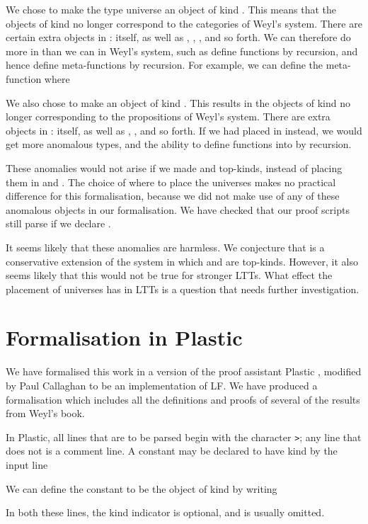 \documentclass[acmtocl]{acmtrans2m}
\begin{document}
We chose to make the type universe  an object of kind .  This means that the objects of kind  no longer correspond to the categories of Weyl's system.  There are certain extra objects in :  itself, as well as , , , and so forth.  We can therefore do more in  than we can in Weyl's system, such as
define functions  by recursion, and hence define meta-functions  by recursion.  For example, we can define the meta-function  where


We also chose to make  an object of kind .  This results in the objects of kind  no longer corresponding to the propositions of Weyl's system.  There are extra objects in :  itself, as well as , , and so forth.  If we had placed  in  instead, we would get more anomalous types, and the ability to define functions into  by recursion.

These anomalies would not arise if we made  and  top-kinds, instead of placing them in  and .
The choice of where to place the universes makes no practical difference for this formalisation, because we did not make use of any of these anomalous objects in our formalisation.  We have checked that our proof scripts still parse if we declare .

It seems likely that these anomalies are harmless.  We conjecture that  is a conservative extension of the system in which  and  are top-kinds.  However, it also seems likely that this would not be true for stronger LTTs.  What effect the placement of universes has in LTTs is a question that needs further investigation.

\section{Formalisation in Plastic}
\label{section:formal}

We have formalised this work in a version of the proof assistant
Plastic \cite{plastic}, modified by Paul Callaghan to be an
implementation of LF.  We have produced a formalisation which
includes all the definitions and proofs of several of the results
from Weyl's book.

In Plastic, all lines that are to be parsed begin with the character
\texttt{>}; any line that does not is a comment line.  A constant
 may be declared to have kind 
by the input line

We can define the constant  to be the object  of kind  by writing

In both these lines, the kind indicator  is optional, and is usually omitted.
\end{document}
